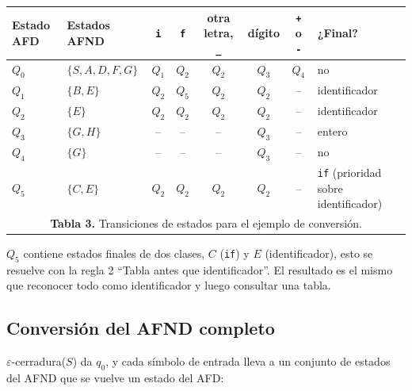\documentclass[12pt,letterpaper]{article}
\newcommand{\cd}[1]{\texttt{#1}}                       %
\begin{document}
\begin{center}
\small
\begin{tabularx}{\textwidth}{@{}l l c c c c c X@{}}
\toprule
\textbf{Estado AFD} & \textbf{Estados AFND} & \cd{i} & \cd{f} & \textbf{otra letra, \cd{\_}} & \textbf{dígito} & \cd{+} o \cd{-} & \textbf{¿Final?} \\
\midrule
$Q_0$ & $\{S, A, D, F, G\}$ & $Q_1$ & $Q_2$ & $Q_2$ & $Q_3$ & $Q_4$ & no \\
$Q_1$ & $\{B, E\}$ & $Q_2$ & $Q_5$ & $Q_2$ & $Q_2$ & -- & identificador \\
$Q_2$ & $\{E\}$ & $Q_2$ & $Q_2$ & $Q_2$ & $Q_2$ & -- & identificador \\
$Q_3$ & $\{G, H\}$ & -- & -- & -- & $Q_3$ & -- & entero \\
$Q_4$ & $\{G\}$ & -- & -- & -- & $Q_3$ & -- & no \\
$Q_5$ & $\{C, E\}$ & $Q_2$ & $Q_2$ & $Q_2$ & $Q_2$ & -- & \cd{if} (prioridad sobre identificador) \\
\bottomrule
\multicolumn{8}{c}{\vspace{2pt}\footnotesize \textbf{Tabla 3.} Transiciones de estados para el ejemplo de conversión.} \\
\end{tabularx}
\end{center}

$Q_5$ contiene estados finales de dos clases, $C$ (\cd{if}) y $E$ (identificador), esto se resuelve con la regla 2 “Tabla antes que identificador”. El resultado es el mismo que reconocer todo como identificador y luego consultar una tabla.

\subsection{Conversión del AFND completo}

$\varepsilon$-cerradura($S$) da $q_0$, y cada símbolo de entrada lleva a un conjunto de estados del AFND que se vuelve un estado del AFD:
\end{document}
